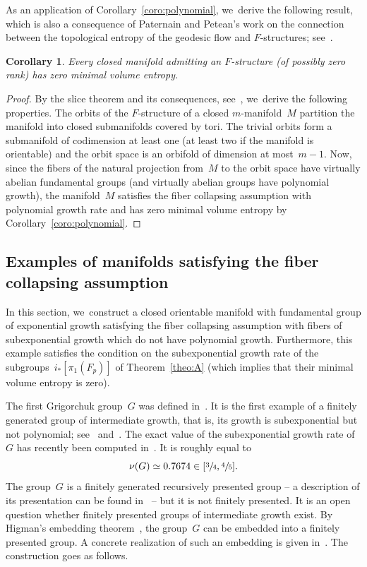 \documentclass[11pt]{article}
\newcommand{\Subsection}{\subsection}
\let\oldsfrac\sfrac
\renewcommand{\sfrac}[2]{{\oldsfrac{#1}{#2}}}
\newtheorem{corollary}[theorem]{Corollary}
\theoremstyle{definition}
\numberwithin{equation}{section}
\begin{document}
As an application of Corollary~\ref{coro:polynomial}, we~derive the following result, which is also a consequence of Paternain and Petean's work on the connection between the topological entropy of the geodesic flow and $F$-structures; see~\cite[Th.\,A]{PP03}.

\begin{corollary}
Every closed manifold admitting an $F$-structure (of possibly zero rank) has zero minimal volume entropy.
\end{corollary}

\begin{proof}
By the slice theorem and its consequences, see~\cite[App.\,B]{GGK}, we~derive the following properties.
The orbits of the $F$-structure of a closed $m$\nobreakdash-manifold~$M$ partition the manifold into closed submanifolds covered by tori. The trivial orbits form a submanifold of codimension at least one (at least two if the manifold is orientable) and the orbit space is an orbifold of dimension at most~$m-1$.
Now, since the fibers of the natural projection from~$M$ to the orbit space have virtually abelian fundamental groups (and virtually abelian groups have polynomial growth), the manifold~$M$ satisfies the fiber collapsing assumption with polynomial growth rate and has zero minimal volume entropy by Corollary~\ref{coro:polynomial}.
\end{proof}

\Subsection{Examples of manifolds satisfying the fiber collapsing assumption} \label{sec:ex}

In this section, we~construct a closed orientable manifold with fundamental group of exponential growth satisfying the fiber collapsing assumption with fibers of subexponential growth which do not have polynomial growth.
Furthermore, this example satisfies the condition on the subexponential growth rate of the subgroups~$i_*[\pi_1(F_p)]$ of Theorem~\ref{theo:A} (which implies that their minimal volume entropy is zero).

The first Grigorchuk group~$G$ was defined in~\cite{grigorchuk1}.
It is the first example of a finitely generated group of intermediate growth, that is, its growth is subexponential but not polynomial; see~\cite{grigorchuk} and~\cite{grigorchuk2}.
The exact value of the subexponential growth rate of~$G$ has recently been computed in~\cite{EZ20}.
It is roughly equal to
\[
\nu(G) \simeq 0.7674 \in [\sfrac{3}{4},\sfrac{4}{5}].
\]
The group~$G$ is a finitely generated recursively presented group -- a description of its presentation can be found in~\cite{lys} -- but it is not finitely presented.
It is an open question whether finitely presented groups of intermediate growth exist.
By Higman's embedding theorem~\cite{hig61}, the group~$G$ can be embedded into a finitely presented group.
A concrete realization of such an embedding is given in~\cite[Th.\,1]{grigorchuk2}.
The construction goes as follows.
\end{document}
